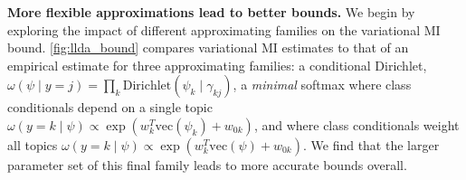 \textbf{More flexible approximations lead to better bounds.}
We begin by exploring the impact of different approximating families
on the variational MI bound.  \FIG\ref{fig:llda_bound} compares
variational MI estimates to that of an empirical estimate for three
approximating families: a conditional Dirichlet, $\omega(\psi \mid
y=j) = \prod_k \text{Dirichlet}(\psi_k \mid \gamma_{kj})$,
a \emph{minimal} softmax where class conditionals depend on a single
topic $\omega(y = k \mid \psi) \propto \exp( w_k^T \text{vec}(\psi_k)
+ w_{0k} )$, and where class conditionals weight all topics
$\omega(y = k \mid \psi) \propto \exp( w_k^T \text{vec}(\psi) + w_{0k}
)$.  We find that the larger parameter set of this final family leads
to more accurate bounds overall.








